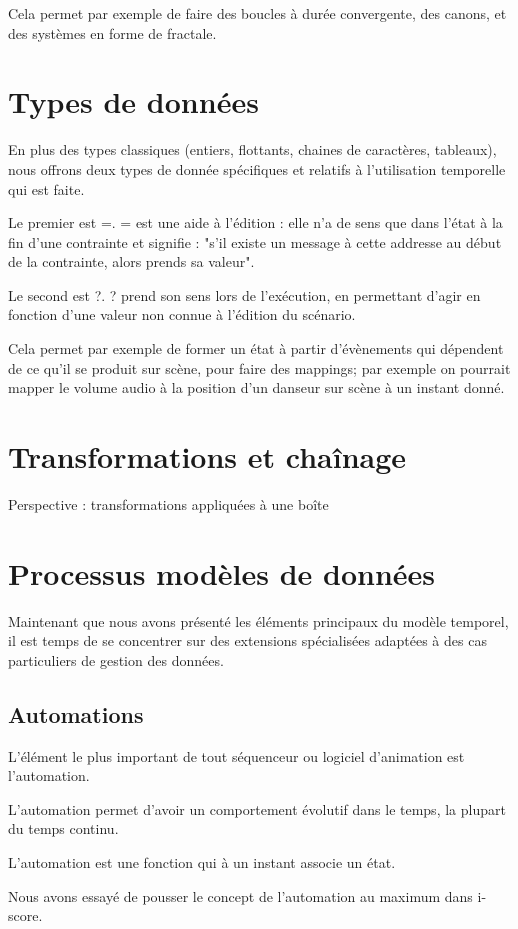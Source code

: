 \documentclass{sigchi}
\begin{document}
Cela permet par exemple de faire des boucles à durée convergente, des canons, et des systèmes en forme de fractale. %

\section{Types de données}
En plus des types classiques (entiers, flottants, chaines de caractères, tableaux),  nous offrons deux types de donnée spécifiques et relatifs à l'utilisation temporelle qui est faite.

Le premier est =. = est une aide à l'édition : elle n'a de sens que dans l'état à la fin d'une contrainte et signifie : "s'il existe un message à cette addresse au début de la contrainte, alors prends sa valeur".

Le second est ?. ? prend son sens lors de l'exécution, en permettant d'agir en fonction d'une valeur non connue à l'édition du scénario.

Cela permet par exemple de former un état à partir d'évènements qui dépendent de ce qu'il se produit sur scène, pour faire des mappings; par exemple on pourrait mapper le volume audio à la position d'un danseur sur scène à un instant donné.

\section{Transformations et chaînage}
Perspective : transformations appliquées à une boîte

\section{Processus modèles de données}
Maintenant que nous avons présenté les éléments principaux du modèle temporel, il est temps de se concentrer sur des extensions spécialisées adaptées à des cas particuliers de gestion des données.

\subsection{Automations}
L'élément le plus important de tout séquenceur ou logiciel d'animation est l'automation.

L'automation permet d'avoir un comportement évolutif dans le temps, la plupart du temps continu.

L'automation est une fonction qui à un instant associe un état.

Nous avons essayé de pousser le concept de l'automation au maximum dans i-score.
\end{document}
